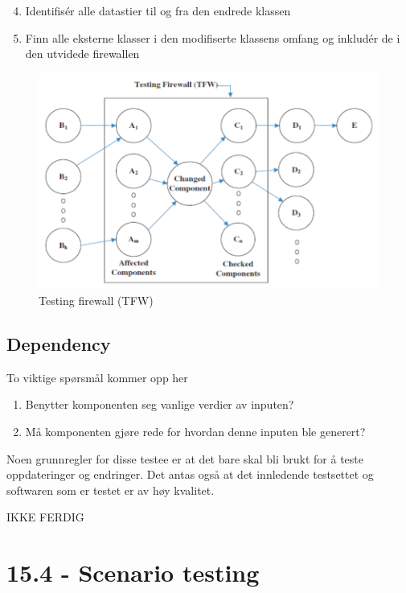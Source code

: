 \begin{enumerate}[1.]
\setcounter{enumi}{3}
\item
  Identifisér alle datastier til og fra den endrede klassen
\item
  Finn alle eksterne klasser i den modifiserte klassens omfang og
  inkludér de i den utvidede firewallen
\end{enumerate}
\begin{figure}[htbp]
\centering
\includegraphics{Forelesning 15/img/firewall.png}
\caption{Testing firewall (TFW)}
\end{figure}

\subsection{Dependency}

To viktige spørsmål kommer opp her

\begin{enumerate}[1.]
\item
  Benytter komponenten seg vanlige verdier av inputen?
\item
  Må komponenten gjøre rede for hvordan denne inputen ble generert?
\end{enumerate}
Noen grunnregler for disse testee er at det bare skal bli brukt for å
teste oppdateringer og endringer. Det antas også at det innledende
testsettet og softwaren som er testet er av høy kvalitet.

IKKE FERDIG

\section{15.4 - Scenario testing}

